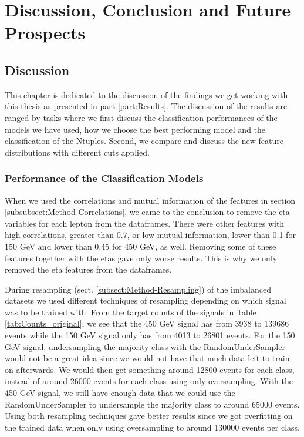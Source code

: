 \documentclass[a4paper, american, 12pt]{report}
\begin{document}
	\part{Discussion, Conclusion and Future Prospects}
	\label{part:Conclusion}
	
	\chapter{Discussion}  %
	\label{chap:Discussion}
	This chapter is dedicated to the discussion of the findings we get working with this thesis as presented in part \ref{part:Results}. The discussion of the results are ranged by tasks where we first discuss the classification performances of the models we have used, how we choose the best performing model and the classification of the Ntuples. Second, we compare and discuss the new feature distributions with different cuts applied.
	
	
	\section{Performance of the Classification Models}
	\label{sect:Discussion-PerformanceEval}	
	When we used the correlations and mutual information of the features in section \ref{subsubsect:Method-Correlations}, we came to the conclusion to remove the eta variables for each lepton from the dataframes. There were other features with high correlations, greater than 0.7, or low mutual information, lower than 0.1 for 150 GeV and lower than 0.45 for 450 GeV, as well. Removing some of these features together with the etas gave only worse results. This is why we only removed the eta features from the dataframes.
	
	During resampling (sect. \ref{subsect:Method-Resampling}) of the imbalanced datasets we used different techniques of resampling depending on which signal was to be trained with. From the target counts of the signals in Table \ref{tab:Counts_original}, we see that the 450 GeV signal has from 3938 to 139686 events while the 150 GeV signal only has from 4013 to 26801 events. For the 150 GeV signal, undersampling the majority class with the RandomUnderSampler would not be a great idea since we would not have that much data left to train on afterwards. We would then get something around 12800 events for each class, instead of around 26000 events for each class using only oversampling. With the 450 GeV signal, we still have enough data that we could use the RandomUnderSampler to undersample the majority class to around 65000 events. Using both resampling techniques gave better results since we got overfitting on the trained data when only using oversampling to around 130000 events per class.
	
\end{document}

